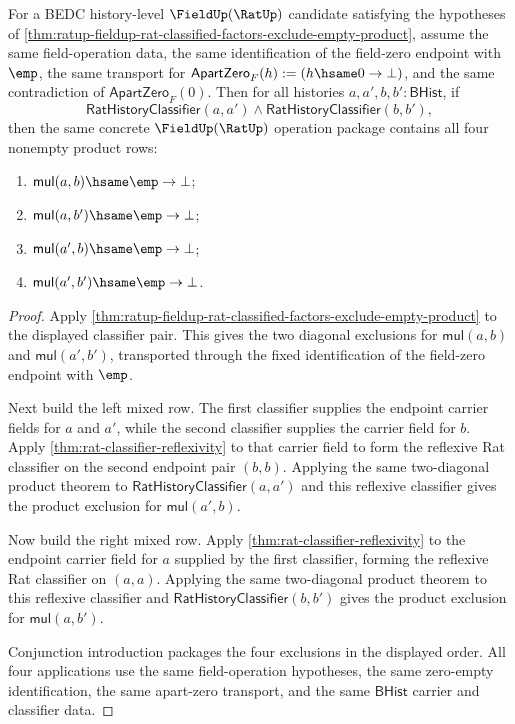 \begin{theorem}
\label{thm:ratup-fieldup-four-endpoint-product-nonempty}
For a BEDC history-level $\FieldUp(\RatUp)$ candidate satisfying the hypotheses
of \autoref{thm:ratup-fieldup-rat-classified-factors-exclude-empty-product},
assume the same field-operation data, the same identification of the field-zero
endpoint with $\emp$, the same transport for
$\mathsf{ApartZero}_F(h):=(h\hsame0\to\bot)$, and the same contradiction of
$\mathsf{ApartZero}_F(0)$. Then for all histories
$a,a',b,b':\mathsf{BHist}$,
if
$$
\mathsf{RatHistoryClassifier}(a,a')
\land
\mathsf{RatHistoryClassifier}(b,b'),
$$
then the same concrete $\FieldUp(\RatUp)$ operation package contains all four
nonempty product rows:
\begin{enumerate}
  \item $\mathsf{mul}(a,b)\hsame\emp\to\bot$;
  \item $\mathsf{mul}(a,b')\hsame\emp\to\bot$;
  \item $\mathsf{mul}(a',b)\hsame\emp\to\bot$;
  \item $\mathsf{mul}(a',b')\hsame\emp\to\bot$.
\end{enumerate}
\end{theorem}
\begin{proof}
Apply
\autoref{thm:ratup-fieldup-rat-classified-factors-exclude-empty-product} to the
displayed classifier pair. This gives the two diagonal exclusions for
$\mathsf{mul}(a,b)$ and $\mathsf{mul}(a',b')$, transported through the fixed
identification of the field-zero endpoint with $\emp$.

Next build the left mixed row. The first classifier supplies the endpoint
carrier fields for $a$ and $a'$, while the second classifier supplies the
carrier field for $b$. Apply \autoref{thm:rat-classifier-reflexivity} to that
carrier field to form the reflexive Rat classifier on the second endpoint pair
$(b,b)$. Applying the same two-diagonal product theorem to
$\mathsf{RatHistoryClassifier}(a,a')$ and this reflexive classifier gives the
product exclusion for $\mathsf{mul}(a',b)$.

Now build the right mixed row. Apply
\autoref{thm:rat-classifier-reflexivity} to the endpoint carrier field for $a$
supplied by the first classifier, forming the reflexive Rat classifier on
$(a,a)$. Applying the same two-diagonal product theorem to this reflexive
classifier and $\mathsf{RatHistoryClassifier}(b,b')$ gives the product
exclusion for $\mathsf{mul}(a,b')$.

Conjunction introduction packages the four exclusions in the displayed order.
All four applications use the same field-operation hypotheses, the same
zero-empty identification, the same apart-zero transport, and the same
$\mathsf{BHist}$ carrier and classifier data.
\end{proof}

